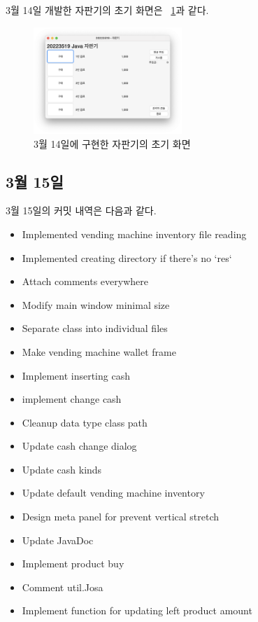 \documentclass{oblivoir}
\newcommand{\figref}[1]{\figurename~\ref{#1}}
\begin{document}
    3월 14일 개발한 자판기의 초기 화면은 \figref{fig:0314-vending-machine}과 같다.
    \begin{figure}[h]
        \centering
        \includegraphics[width=0.5\textwidth]{images/dev-snapshop/0314-vending-machine}
        \caption{3월 14일에 구현한 자판기의 초기 화면}
        \label{fig:0314-vending-machine}
    \end{figure}

    \subsection{3월 15일}

    3월 15일의 커밋 내역은 다음과 같다.
    \begin{itemize}
        \item Implemented vending machine inventory file reading
        \item Implemented creating directory if there's no `res`
        \item Attach comments everywhere
        \item Modify main window minimal size
        \item Separate class into individual files
        \item Make vending machine wallet frame
        \item Implement inserting cash
        \item implement change cash
        \item Cleanup data type class path
        \item Update cash change dialog
        \item Update cash kinds
        \item Update default vending machine inventory
        \item Design meta panel for prevent vertical stretch
        \item Update JavaDoc
        \item Implement product buy
        \item Comment util.Josa
        \item Implement function for updating left product amount
    \end{itemize}
\end{document}

